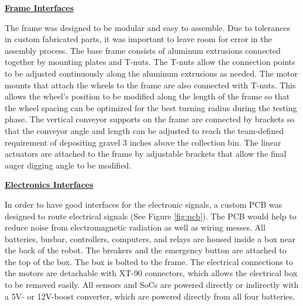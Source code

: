 \documentclass[class=article, crop=false]{standalone}
\begin{document}
	\vspace*{0.1in}
	\noindent\textbf{\underline{Frame Interfaces}}
	
	The frame was designed to be modular and easy to assemble. Due to tolerances in custom fabricated parts, it was important to leave room for error in the assembly process. The base frame consists of aluminum extrusions connected together by mounting plates and T-nuts. The T-nuts allow the connection points to be adjusted continuously along the aluminum extrusions as needed. The motor mounts that attach the wheels to the frame are also connected with T-nuts. This allows the wheel’s position to be modified along the length of the frame so that the wheel spacing can be optimized for the best turning radius during the testing phase. The vertical conveyor supports on the frame are connected by brackets so that the conveyor angle and length can be adjusted to reach the team-defined requirement of depositing gravel 3 inches above the collection bin. The linear actuators are attached to the frame by adjustable brackets that allow the final auger digging angle to be modified. 
	
	\vspace*{0.1in}
	\newpage
	\noindent\textbf{\underline{Electronics Interfaces}}
	
	In order to have good interfaces for the electronic signals, a custom PCB was designed to route electrical signals (See Figure \ref{fig:pcb}). The PCB would help to reduce noise from electromagnetic radiation as well as wiring messes. All batteries, busbar, controllers, computers, and relays are housed inside a box near the back of the robot. The breakers and the emergency button are attached to the top of the box. The box is bolted to the frame. The electrical connections to the motors are detachable with XT-90 connectors, which allows the electrical box to be removed easily. All sensors and SoCs are powered directly or indirectly with a 5V- or 12V-boost converter, which are powered directly from all four batteries.
\end{document}
